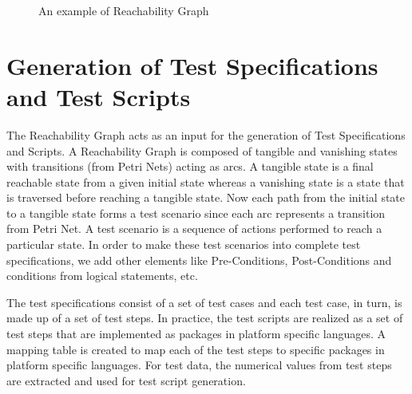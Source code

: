 \begin{figure}[htb!]
\centering
{}
\caption{An example of Reachability Graph}
\label{fig:rgexp}
\end{figure}

\section{Generation of Test Specifications and Test Scripts}
The Reachability Graph acts as an input for the generation of Test Specifications and Scripts. A Reachability Graph is composed of tangible and vanishing states with transitions (from Petri Nets) acting as arcs. A tangible state is a final reachable state from a given initial state whereas a vanishing state is a state that is traversed before reaching a tangible state. Now each path from the initial state to a tangible state forms a test scenario since each arc represents a transition from Petri Net. A test scenario is a sequence of actions performed to reach a particular state. In order to make these test scenarios into complete test specifications, we add other elements like Pre-Conditions, Post-Conditions and conditions from logical statements, etc. 

The test specifications consist of a set of test cases and each test case, in turn, is made up of a set of test steps. In practice, the test scripts are realized as a set of test steps that are implemented as packages in platform specific languages. A mapping table is created to map each of the test steps to specific packages in platform specific languages. For test data, the numerical values from test steps are extracted and used for test script generation.





